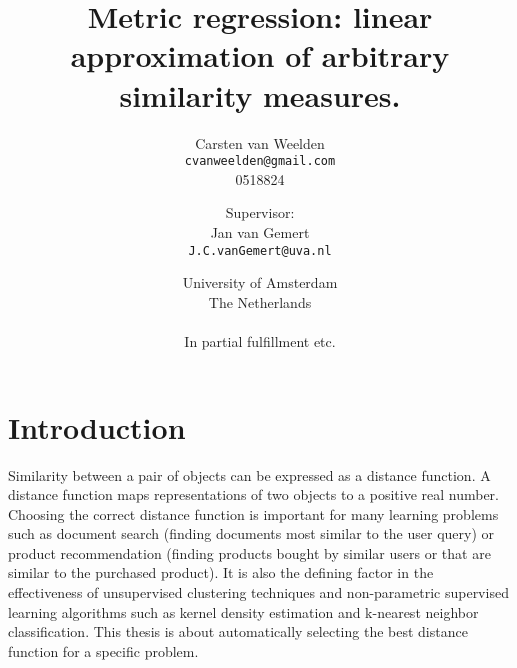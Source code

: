 \documentclass[a4paper,titlepage]{article}
\title{Metric regression: linear approximation of arbitrary similarity measures.}
\author{Carsten van Weelden  \\ \texttt{cvanweelden@gmail.com} \\ 0518824 \and \small{Supervisor:} \\ Jan van Gemert \\ \texttt{J.C.vanGemert@uva.nl} \and University of Amsterdam\\
  The Netherlands \\ \\ In partial fulfillment etc.}
\begin{document}
\maketitle

\begin{abstract}

\end{abstract}

\pagebreak




\tableofcontents

\pagebreak

















%


\section{Introduction} 

Similarity between a pair of objects can be expressed as a distance function. A distance function maps representations of two objects to a positive real number. Choosing the correct distance function is important for many learning problems such as document search (finding documents most similar to the user query) or product recommendation (finding products bought by similar users or that are similar to the purchased product). It is also the defining factor in the effectiveness of unsupervised clustering techniques and non-parametric supervised learning algorithms such as kernel density estimation and k-nearest neighbor classification. This thesis is about automatically selecting the best distance function for a specific problem.
\end{document}
